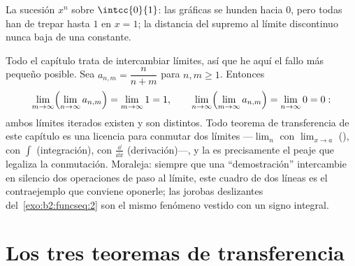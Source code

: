 \begin{omfigure}

{\small La sucesión $x^n$ sobre $\intcc{0}{1}$: las gráficas se
hunden hacia $0$, pero todas han de trepar hasta $1$ en $x = 1$; la
distancia del supremo al límite  discontinuo nunca baja de una
constante.}
\end{omfigure}

\begin{example}\label{ex:b2:funcseq:doublelimit}
Todo el capítulo trata de intercambiar límites, así que he aquí el
fallo más pequeño posible. Sea $a_{n,m} = \dfrac{n}{n+m}$ para $n, m
\geq 1$. Entonces
\[
\lim_{m\to\infty}\Bigl(\lim_{n\to\infty}a_{n,m}\Bigr)
= \lim_{m\to\infty} 1 = 1,
\qquad
\lim_{n\to\infty}\Bigl(\lim_{m\to\infty}a_{n,m}\Bigr)
= \lim_{n\to\infty} 0 = 0 :
\]
ambos límites iterados existen y son distintos. Todo teorema de
transferencia de este capítulo es una licencia para conmutar dos
límites ---$\lim_n$ con $\lim_{x\to a}$ (), con $\int$
(integración), con $\frac{\dd}{\dd x}$ (derivación)---, y la
 es precisamente el peaje que legaliza la
conmutación. Moraleja: siempre que una ``demostración'' intercambie
en silencio dos operaciones de paso al límite, este cuadro de dos
líneas es el contraejemplo que conviene oponerle; las jorobas
deslizantes del~\cref{exo:b2:funcseq:2} son el mismo fenómeno vestido
con un signo integral.
\end{example}

\section{Los tres teoremas de transferencia}

